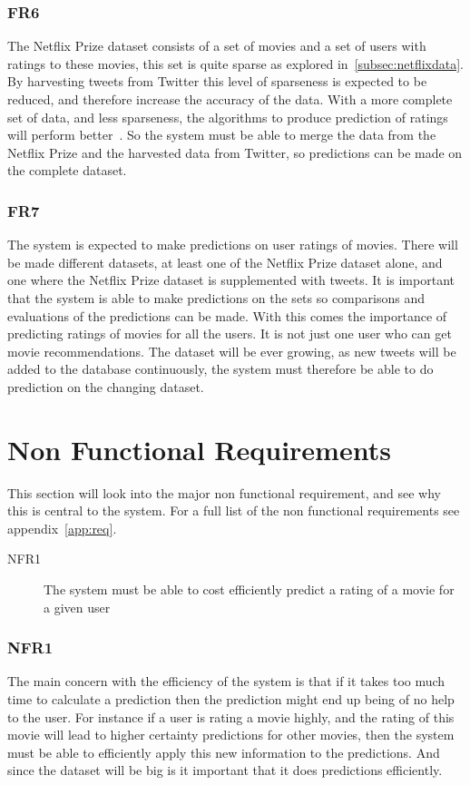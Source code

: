 \subsubsection{FR6}
The Netflix Prize dataset consists of a set of movies and a set of users with ratings to these movies, this set is quite sparse as explored in~\ref{subsec:netflixdata}. By harvesting tweets from Twitter this level of sparseness is expected to be reduced, and therefore increase the accuracy of the data. With a more complete set of data, and less sparseness, the algorithms to produce prediction of ratings will perform better~\cite{grobelnikDataSparsityIssues}. So the system must be able to merge the data from the Netflix Prize and the harvested data from Twitter, so predictions can be made on the complete dataset.

\subsubsection{FR7}
The system is expected to make predictions on user ratings of movies. There will be made different datasets, at least one of the Netflix Prize dataset alone, and one where the Netflix Prize dataset is supplemented with tweets. It is important that the system is able to make predictions on the sets so comparisons and evaluations of the predictions can be made.
With this comes the importance of predicting ratings of movies for all the users. It is not just one user who can get movie recommendations. The dataset will be ever growing, as new tweets will be added to the database continuously, the system must therefore be able to do prediction on the changing dataset.

\section{Non Functional Requirements}\label{section:non-functional-requirements}
This section will look into the major non functional requirement, and see why this is central to the system. For a full list of the non functional requirements see appendix~\ref{app:req}.
\begin{description}
  \item[NFR1] The system must be able to cost efficiently predict a rating of a movie for a given user
\end{description}

\subsubsection{NFR1}
The main concern with the efficiency of the system is that if it takes too much time to calculate a prediction then the prediction might end up being of no help to the user. For instance if a user is rating a movie highly, and the rating of this movie will lead to higher certainty predictions for other movies, then the system must be able to efficiently apply this new information to the predictions. And since the dataset will be big is it important that it does predictions efficiently.



